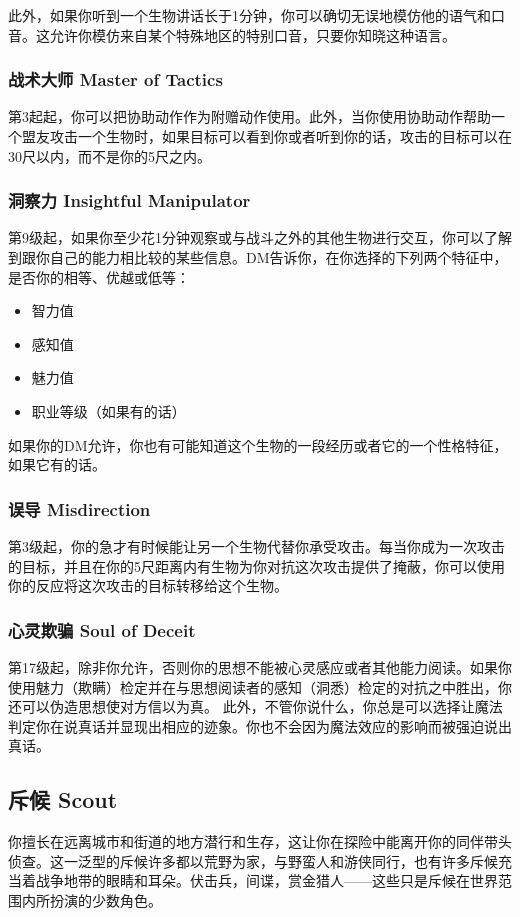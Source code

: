 此外，如果你听到一个生物讲话长于1分钟，你可以确切无误地模仿他的语气和口音。这允许你模仿来自某个特殊地区的特别口音，只要你知晓这种语言。

\subsubsection{战术大师 Master of Tactics}第3起起，你可以把协助动作作为附赠动作使用。此外，当你使用协助动作帮助一个盟友攻击一个生物时，如果目标可以看到你或者听到你的话，攻击的目标可以在30尺以内，而不是你的5尺之内。

\subsubsection{洞察力 Insightful Manipulator}第9级起，如果你至少花1分钟观察或与战斗之外的其他生物进行交互，你可以了解到跟你自己的能力相比较的某些信息。DM告诉你，在你选择的下列两个特征中，是否你的相等、优越或低等：
\begin{itemize}
\item 智力值
\item 感知值
\item 魅力值
\item 职业等级（如果有的话）
\end{itemize}

如果你的DM允许，你也有可能知道这个生物的一段经历或者它的一个性格特征，如果它有的话。

\subsubsection{误导 Misdirection}第3级起，你的急才有时候能让另一个生物代替你承受攻击。每当你成为一次攻击的目标，并且在你的5尺距离内有生物为你对抗这次攻击提供了掩蔽，你可以使用你的反应将这次攻击的目标转移给这个生物。

\subsubsection{心灵欺骗 Soul of Deceit}第17级起，除非你允许，否则你的思想不能被心灵感应或者其他能力阅读。如果你使用魅力（欺瞒）检定并在与思想阅读者的感知（洞悉）检定的对抗之中胜出，你还可以伪造思想使对方信以为真。
此外，不管你说什么，你总是可以选择让魔法判定你在说真话并显现出相应的迹象。你也不会因为魔法效应的影响而被强迫说出真话。

\subsection{斥候 Scout}你擅长在远离城市和街道的地方潜行和生存，这让你在探险中能离开你的同伴带头侦查。这一泛型的斥候许多都以荒野为家，与野蛮人和游侠同行，也有许多斥候充当着战争地带的眼睛和耳朵。伏击兵，间谍，赏金猎人——这些只是斥候在世界范围内所扮演的少数角色。

